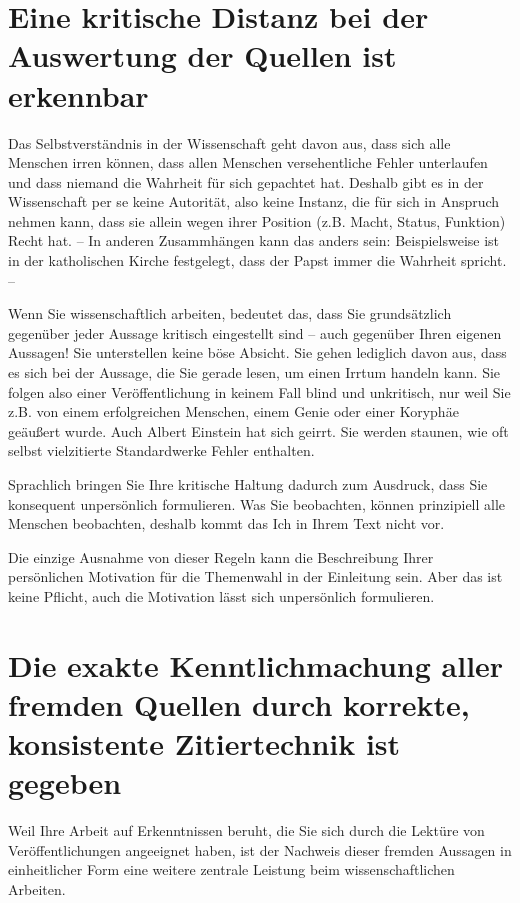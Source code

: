 \section{Eine kritische Distanz bei der Auswertung der Quellen ist erkennbar}
\label{sec:kritische-distanz}

Das Selbstverständnis in der Wissenschaft geht davon aus, dass sich alle Menschen irren können, dass allen Menschen versehentliche Fehler unterlaufen und dass niemand die Wahrheit für sich gepachtet hat. Deshalb gibt es in der Wissenschaft per se keine Autorität, also keine Instanz, die für sich in Anspruch nehmen kann, dass sie allein wegen ihrer Position (z.B. Macht, Status, Funktion) Recht hat. – In anderen Zusammhängen kann das anders sein: Beispielsweise ist in der katholischen Kirche festgelegt, dass der Papst immer die Wahrheit spricht. –

Wenn Sie wissenschaftlich arbeiten, bedeutet das, dass Sie grundsätzlich gegenüber jeder Aussage kritisch eingestellt sind – auch gegenüber Ihren eigenen Aussagen! Sie unterstellen keine böse Absicht. Sie gehen lediglich davon aus, dass es sich bei der Aussage, die Sie gerade lesen, um einen Irrtum handeln kann. Sie folgen also einer Veröffentlichung in keinem Fall blind und unkritisch, nur weil Sie z.B. von einem erfolgreichen Menschen, einem Genie oder einer Koryphäe geäußert wurde. Auch Albert Einstein hat sich geirrt. Sie werden staunen, wie oft selbst vielzitierte Standardwerke Fehler enthalten.

Sprachlich bringen Sie Ihre kritische Haltung dadurch zum Ausdruck, dass Sie konsequent unpersönlich formulieren. Was Sie beobachten, können prinzipiell alle Menschen beobachten, deshalb kommt das \glqq Ich\grqq{} in Ihrem Text nicht vor.

Die einzige Ausnahme von dieser Regeln kann die Beschreibung Ihrer persönlichen Motivation für die Themenwahl in der Einleitung sein. Aber das ist keine Pflicht, auch die Motivation lässt sich unpersönlich formulieren.

\section{Die exakte Kenntlichmachung aller fremden Quellen durch korrekte, konsistente Zitiertechnik ist gegeben}
\label{sec:kenntlichmachung-quellen}

Weil Ihre Arbeit auf Erkenntnissen beruht, die Sie sich durch die Lektüre von Veröffentlichungen angeeignet haben, ist der Nachweis dieser fremden Aussagen in einheitlicher Form eine weitere zentrale Leistung beim wissenschaftlichen Arbeiten.

